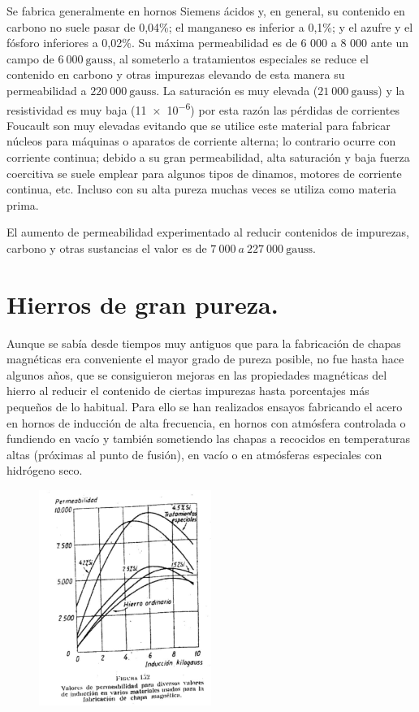 \documentclass[12pt,a4paper]{article}
\begin{document}
Se fabrica generalmente en hornos Siemens ácidos y, en general, su contenido en carbono no suele pasar de 0,04\%; el manganeso es inferior a 0,1\%; y el azufre y el fósforo inferiores a 0,02\%. Su máxima permeabilidad es de 6 000 a 8 000 ante un campo de $6\ 000\ \mathrm{gauss}$, al someterlo a tratamientos especiales se reduce el contenido en carbono y otras impurezas elevando de esta manera su permeabilidad a $220\ 000\ \mathrm{gauss}$. La saturación es muy elevada ($21\ 000\ \mathrm{gauss}$) y la resistividad es muy baja (\SI{11e-6}{\Omega}) por esta razón las pérdidas de corrientes Foucault son muy elevadas evitando que se utilice este material para fabricar núcleos para máquinas o aparatos de corriente alterna; lo contrario ocurre con corriente continua; debido a su gran permeabilidad, alta saturación y baja fuerza coercitiva se suele emplear para algunos tipos de dinamos, motores de corriente continua, etc. Incluso con su alta pureza muchas veces se utiliza como materia prima.

El aumento de permeabilidad experimentado al reducir contenidos de impurezas, carbono y otras sustancias el valor es de $7\ 000\ a\ 227\ 000\ \mathrm{gauss}$.

\section{Hierros de gran pureza.}

Aunque se sabía desde tiempos muy antiguos que para la fabricación de chapas magnéticas era conveniente el mayor grado de pureza posible, no fue hasta hace algunos años, que se consiguieron mejoras en las propiedades magnéticas del hierro al reducir el contenido de ciertas impurezas hasta porcentajes más pequeños de lo habitual. Para ello se han realizados ensayos fabricando el acero en hornos de inducción de alta frecuencia, en hornos con atmósfera controlada o fundiendo en vacío y también sometiendo las chapas a recocidos en temperaturas altas (próximas al punto de fusión), en vacío o en atmósferas especiales con hidrógeno seco. 

 \begin{figure}[H]    
    \centering         
    \includegraphics[width=0.5\textwidth]{IMAGENES LATEX/4.jpg}
\end{figure}
\end{document}
